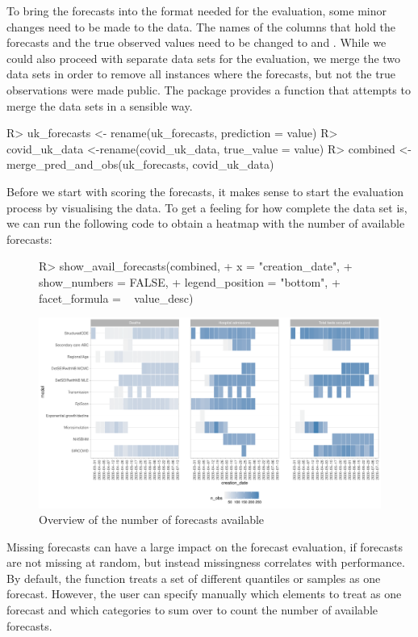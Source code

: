 \documentclass[article,shortnames]{jss}
\begin{document}
% 
To bring the forecasts into the format needed for the evaluation, some minor changes need to be made to the data. The names of the columns that hold the forecasts and the true observed values need to be changed to  and . While we could also proceed with separate data sets for the evaluation, we merge the two data sets in order to remove all instances where the forecasts, but not the true observations were made public. The  package provides a function that attempts to merge the data sets in a sensible way. 
% 
\begin{Schunk}
\begin{Sinput}
R> uk_forecasts <- rename(uk_forecasts, prediction = value)
R> covid_uk_data <-rename(covid_uk_data, true_value = value)
R> combined <- merge_pred_and_obs(uk_forecasts, covid_uk_data)
\end{Sinput}
\end{Schunk}
% 
Before we start with scoring the forecasts, it makes sense to start the evaluation process by visualising the data. To get a feeling for how complete the data set is, we can run the following code to obtain a heatmap with the number of available forecasts: 
% 
\begin{figure}[h]
\centering
\begin{Schunk}
\begin{Sinput}
R> show_avail_forecasts(combined, 
+                       x = "creation_date", 
+                       show_numbers = FALSE,
+                       legend_position = "bottom",
+                       facet_formula = ~ value_desc)
\end{Sinput}
\end{Schunk}
\includegraphics{plots/plot-show-availability}
\caption{\label{fig:avail-forecasts} Overview of the number of forecasts available}
\end{figure}
% 
Missing forecasts can have a large impact on the forecast evaluation, if forecasts are not missing at random, but instead missingness correlates with performance. By default, the function treats a set of different quantiles or samples as one forecast. However, the user can specify manually which elements to treat as one forecast and which categories to sum over to count the number of available forecasts. 
\end{document}
